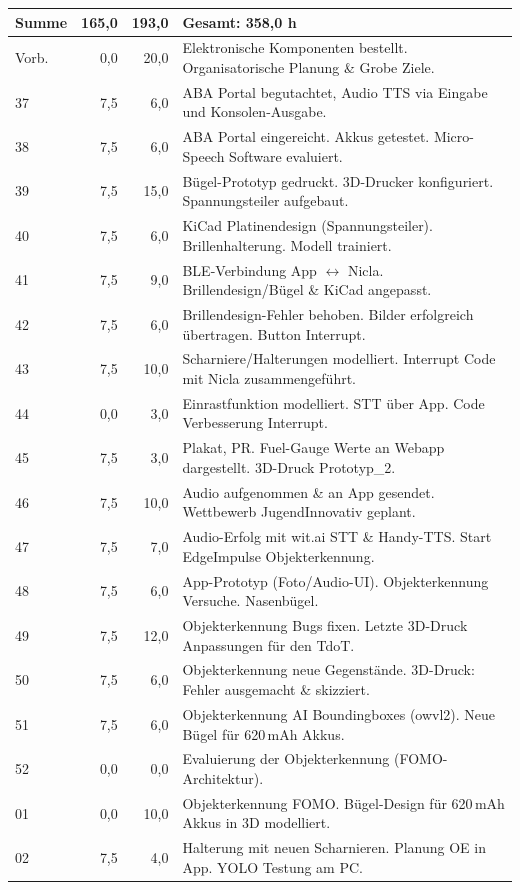 \begin{longtable}{l r r p{\dimexpr\textwidth-4.5cm\relax}}
\hline
\textbf{Summe} & \textbf{165,0} & \textbf{193,0} & \textbf{Gesamt: 358,0 h} \\
\hline
\hline
\endlastfoot
Vorb. & 0,0 & 20,0 & Elektronische Komponenten bestellt. Organisatorische Planung \& Grobe Ziele. \\
37 & 7,5 & 6,0 & ABA Portal begutachtet, Audio TTS via Eingabe und Konsolen-Ausgabe. \\
38 & 7,5 & 6,0 & ABA Portal eingereicht. Akkus getestet. Micro-Speech Software evaluiert. \\
39 & 7,5 & 15,0 & Bügel-Prototyp gedruckt. 3D-Drucker konfiguriert. Spannungsteiler aufgebaut. \\
40 & 7,5 & 6,0 & KiCad Platinendesign (Spannungsteiler). Brillenhalterung. Modell trainiert. \\
41 & 7,5 & 9,0 & BLE-Verbindung App $\leftrightarrow$ Nicla. Brillendesign/Bügel \& KiCad angepasst. \\
42 & 7,5 & 6,0 & Brillendesign-Fehler behoben. Bilder erfolgreich übertragen. Button Interrupt. \\
43 & 7,5 & 10,0 & Scharniere/Halterungen modelliert. Interrupt Code mit Nicla zusammengeführt. \\
44 & 0,0 & 3,0 & Einrastfunktion modelliert. STT über App. Code Verbesserung Interrupt. \\
45 & 7,5 & 3,0 & Plakat, PR. Fuel-Gauge Werte an Webapp dargestellt. 3D-Druck Prototyp\_2. \\
46 & 7,5 & 10,0 & Audio aufgenommen \& an App gesendet. Wettbewerb JugendInnovativ geplant. \\
47 & 7,5 & 7,0 & Audio-Erfolg mit wit.ai STT \& Handy-TTS. Start EdgeImpulse Objekterkennung. \\
48 & 7,5 & 6,0 & App-Prototyp (Foto/Audio-UI). Objekterkennung Versuche. Nasenbügel. \\
49 & 7,5 & 12,0 & Objekterkennung Bugs fixen. Letzte 3D-Druck Anpassungen für den TdoT. \\
50 & 7,5 & 6,0 & Objekterkennung neue Gegenstände. 3D-Druck: Fehler ausgemacht \& skizziert. \\
51 & 7,5 & 6,0 & Objekterkennung AI Boundingboxes (owvl2). Neue Bügel für 620\,mAh Akkus. \\
52 & 0,0 & 0,0 & Evaluierung der Objekterkennung (FOMO-Architektur). \\
01 & 0,0 & 10,0 & Objekterkennung FOMO. Bügel-Design für 620\,mAh Akkus in 3D modelliert. \\
02 & 7,5 & 4,0 & Halterung mit neuen Scharnieren. Planung OE in App. YOLO Testung am PC. \\

\end{longtable}
